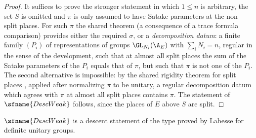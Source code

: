 \begin{proof}
It suffices to prove the stronger statement in which $1\le n$ is arbitrary, the set $S$ is omitted and $\pi$ is only
assumed to have Satake parameters at the non-split places. For such $\pi$ the shared theorem
 (a consequence of a trace formula comparison) provides
either the required $\sigma$, or a \emph{decomposition datum}: a finite family $(P_i)$ of representations of groups
$\GL_{N_i}(\A_E)$ with $\sum_iN_i=n$, regular in the sense of the development, such that at almost all split places the
sum of the Satake parameters of the $P_i$ equals that of $\pi$, but such that $\pi$ is not one of the $P_i$. The second
alternative is impossible: by the shared rigidity theorem for split places ,
applied after normalizing $\pi$ to be unitary, a regular decomposition datum which agrees with $\pi$ at almost all split
places contains $\pi$. The statement of $\sfname{DescWeak}$ follows, since the places of $E$ above $S$ are split.
\end{proof}

$\sfname{DescWeak}$ is a descent statement of the type proved by Labesse \cite{Labesse2011} for definite unitary groups.


